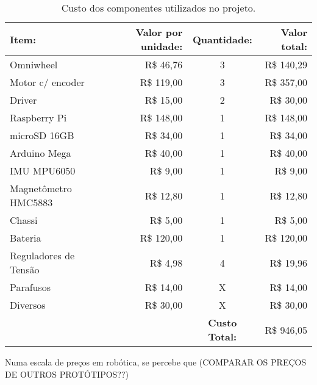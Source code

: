 \begin{table}
  \caption{Custo dos componentes utilizados no projeto.}
  \begin{tabular}{||l r c r||}
     \hline
     \textbf{Item:}   & \textbf{Valor por unidade:} & \textbf{Quantidade:} & \textbf{Valor total:} \\ \hline\hline
     Omniwheel        & R\$ 46,76                   &  3                   & R\$ 140,29            \\ \hline
     Motor c/ encoder & R\$ 119,00                  &  3                   & R\$ 357,00            \\ \hline
     Driver           & R\$ 15,00                   &  2                   & R\$ 30,00             \\ \hline
     Raspberry Pi     & R\$ 148,00                  &  1                   & R\$ 148,00            \\ \hline
     microSD 16GB     & R\$ 34,00                   &  1                   & R\$ 34,00             \\ \hline
     Arduino Mega     & R\$ 40,00                   &  1                   & R\$ 40,00             \\ \hline
     IMU MPU6050      & R\$ 9,00                    &  1                   & R\$ 9,00              \\ \hline
     Magnetômetro HMC5883 & R\$ 12,80               &  1                   & R\$ 12,80             \\ \hline
     Chassi           & R\$ 5,00                    &  1                   & R\$ 5,00              \\ \hline
     Bateria          & R\$ 120,00                  &  1                   & R\$ 120,00            \\ \hline
     Reguladores de Tensão & R\$ 4,98               &  4                   & R\$ 19,96             \\ \hline
     Parafusos        & R\$ 14,00                   &  X                   & R\$ 14,00             \\ \hline
     Diversos         & R\$ 30,00                   &  X                   & R\$ 30,00             \\ \hline\hline
                      &                             & \textbf{Custo Total:} & R\$ 946,05           \\ \hline
  \end{tabular}
  \label{tab:custo}
\end{table}

Numa escala de preços em robótica, se percebe que (COMPARAR OS PREÇOS DE OUTROS PROTÓTIPOS??)
